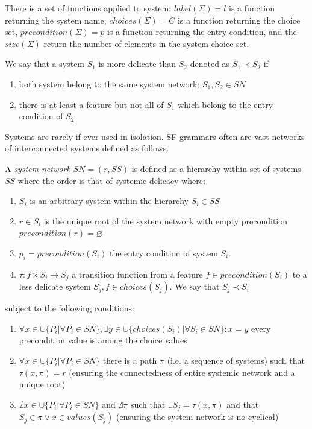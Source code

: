 There is a set of functions applied to system: $label(\Sigma)=l$ is a function returning the system name, $choices(\Sigma)=C$ is a function returning the choice set, $precondition(\Sigma)=p$ is a function returning the entry condition, and the $size(\Sigma)$ return the number of elements in the system choice set.  

\begin{definition}\label{def:delicacy-hierarchy}
	We say that a system $S_{1}$ is more delicate than $S_{2}$ denoted as $S_{1} \prec S_{2}$ if 
	\begin{enumerate}
		\item both system belong to the same system network: $S_{1}, S_{2} \in SN$ 
		\item there is at least a feature but not all of $S_{1}$ which belong to the entry condition of $S_{2}$  
	\end{enumerate} 
\end{definition}

Systems are rarely if ever used in isolation. SF grammars often are vast networks of interconnected systems defined as follows. 

\begin{definition}\label{def:system-network}
	A \textit{system network} $SN=(r,SS)$ is defined as a hierarchy within set of systems $SS$ where the order is that of systemic delicacy where:
	\begin{enumerate}
		\item $S_{i}$ is an arbitrary system within the hierarchy $S_{i} \in SS $
		\item $r \in S_{i}$ is the unique root of the system network with empty precondition $precondition(r)=\varnothing $
		\item $p_{i} = precondition(S_{i})$ the entry condition of system $S_{i}$.
		\item $\tau: f \times S_{i} \rightarrow S_{j}$ a transition function from a feature $f \in precondition(S_{i})$ to a less delicate system $S_{j}, f \in choices(S_{j})$. We say that $S_{j} \prec S_{i}$
	\end{enumerate}
	subject to the following conditions:
	\begin{enumerate}
		\item $\forall x \in \cup \{ P_{i}| \forall P_{i} \in SN \}, \exists y \in \cup \{ choices(S_{i})| \forall S_{i} \in SN \}: x=y$ every precondition value is among the choice values
		\item $\forall x \in \cup \{ P_{i}| \forall P_{i} \in SN \}$ there is a path $\pi$ (i.e. a sequence of systems) such that $\tau(x,\pi)=r$ (ensuring the connectedness of entire systemic network and a unique root)
		\item $\nexists x \in \cup \{ P_{i}| \forall P_{i} \in SN \}$ and $\nexists \pi$ such that $\exists S_{j}=\tau(x,\pi)$ and that $ S_{j} \in \pi \vee x \in values(S_{j}) $ (ensuring the system network is no cyclical)
	\end{enumerate}
\end{definition}

